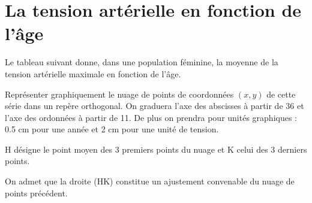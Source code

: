 \section{La tension artérielle en fonction de l'âge}

Le tableau suivant donne, dans une population féminine, la moyenne de la tension artérielle maximale en fonction de l'âge.

\begin{questions}
	\question[] Représenter graphiquement le nuage de points de coordonnées $(x,y)$ de cette série dans un repère orthogonal. 
	On graduera l'axe des abscisses à partir de 36 et l'axe des ordonnées à partir de 11.
	De plus on prendra pour unités graphiques : \num{0.5} cm pour une année et 2 cm pour une unité de tension.
	
	\question[] H désigne le point moyen des 3 premiers points du nuage et K celui des 3 derniers points.
	
	\question[] On admet que la droite (HK) constitue un ajustement convenable du nuage de points précédent.
\end{questions}
